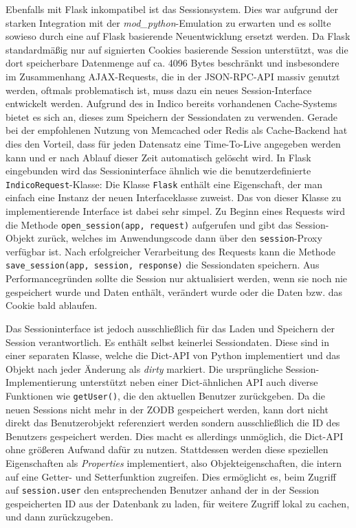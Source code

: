 Ebenfalls mit Flask inkompatibel ist das Sessionsystem. Dies war aufgrund der starken Integration
mit der \emph{mod\_python}-Emulation zu erwarten und es sollte sowieso durch eine auf Flask
basierende Neuentwicklung ersetzt werden. Da Flask standardmäßig nur auf signierten Cookies
basierende Session unterstützt, was die dort speicherbare Datenmenge auf ca. 4096 Bytes beschränkt
und insbesondere im Zusammenhang AJAX-Requests, die in der JSON-RPC-API massiv genutzt werden,
oftmals problematisch ist, muss dazu ein neues Session-Interface entwickelt werden. Aufgrund des in
Indico bereits vorhandenen Cache-Systems bietet es sich an, dieses zum Speichern der Sessiondaten zu
verwenden. Gerade bei der empfohlenen Nutzung von Memcached oder Redis als Cache-Backend hat dies
den Vorteil, dass für jeden Datensatz eine Time-To-Live angegeben werden kann und er nach Ablauf
dieser Zeit automatisch gelöscht wird. In Flask eingebunden wird das Sessioninterface ähnlich wie
die benutzerdefinierte \lstinline{IndicoRequest}-Klasse: Die Klasse \lstinline{Flask} enthält eine
Eigenschaft, der man einfach eine Instanz der neuen Interfaceklasse zuweist. Das von dieser Klasse
zu implementierende Interface ist dabei sehr simpel. Zu Beginn eines Requests wird die Methode
\lstinline{open_session(app, request)} aufgerufen und gibt das Session-Objekt zurück, welches im
Anwendungscode dann über den \lstinline{session}-Proxy verfügbar ist. Nach erfolgreicher
Verarbeitung des Requests kann die Methode \lstinline{save_session(app, session, response)} die
Sessiondaten speichern. Aus Performancegründen sollte die Session nur aktualisiert werden, wenn sie
noch nie gespeichert wurde und Daten enthält, verändert wurde oder die Daten bzw. das Cookie bald
ablaufen.

Das Sessioninterface ist jedoch ausschließlich für das Laden und Speichern der Session
verantwortlich. Es enthält selbst keinerlei Sessiondaten. Diese sind in einer separaten Klasse,
welche die Dict-API von Python implementiert und das Objekt nach jeder Änderung als \emph{dirty}
markiert. Die ursprüngliche Session-Implementierung unterstützt neben einer Dict-ähnlichen API auch
diverse Funktionen wie \lstinline{getUser()}, die den aktuellen Benutzer zurückgeben. Da die neuen
Sessions nicht mehr in der ZODB gespeichert werden, kann dort nicht direkt das Benutzerobjekt
referenziert werden sondern ausschließlich die ID des Benutzers gespeichert werden. Dies macht es
allerdings unmöglich, die Dict-API ohne größeren Aufwand dafür zu nutzen. Stattdessen werden diese
speziellen Eigenschaften als \emph{Properties} implementiert, also Objekteigenschaften, die intern
auf eine Getter- und Setterfunktion zugreifen. Dies ermöglicht es, beim Zugriff auf
\lstinline{session.user} den entsprechenden Benutzer anhand der in der Session gespeicherten ID aus
der Datenbank zu laden, für weitere Zugriff lokal zu cachen, und dann zurückzugeben.

